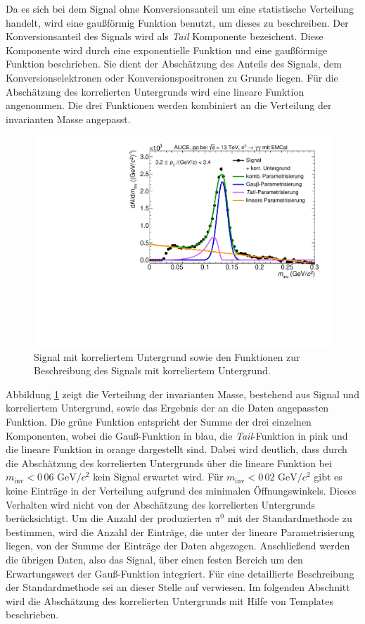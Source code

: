 Da es sich bei dem Signal ohne Konversionsanteil um eine statistische Verteilung handelt, wird eine gaußförmig Funktion benutzt, um dieses zu beschreiben.
\newline
Der Konversionsanteil des Signals wird als \textit{Tail} Komponente bezeichent.
Diese Komponente wird durch eine exponentielle Funktion und eine gaußförmige Funktion beschrieben.
Sie dient der Abschätzung des Anteils des Signals, dem Konversionselektronen oder Konversionspositronen zu Grunde liegen.
Für die Abschätzung des korrelierten Untergrunds wird eine lineare Funktion angenommen.
Die drei Funktionen werden kombiniert an die Verteilung der invarianten Masse angepasst.
\begin{figure}[tp]
\centering
\includegraphics[width=.75\linewidth]{StandardParam.pdf}
\caption{Signal mit korreliertem Untergrund sowie den Funktionen zur Beschreibung des Signals mit korreliertem Untergrund.}
\label{figStandardParam}
\end{figure}
\newline
Abbildung \ref{figStandardParam} zeigt die Verteilung der invarianten Masse, bestehend aus Signal und korreliertem Untergrund, sowie das Ergebnis der an die Daten angepassten Funktion.
Die grüne Funktion entspricht der Summe der drei einzelnen Komponenten, wobei die Gauß-Funktion in blau, die \textit{Tail}-Funktion in pink und die lineare Funktion in orange dargestellt sind.
Dabei wird deutlich, dass durch die Abschätzung des korrelierten Untergrunds über die lineare Funktion bei $m_\text{inv} < 0\,06\text{ GeV}/c^{2}$ kein Signal erwartet wird.
Für $m_\text{inv} < 0\,02\text{ GeV}/c^{2}$ gibt es keine Einträge in der Verteilung aufgrund des minimalen Öffnungswinkels.
Dieses Verhalten wird nicht von der Abschätzung des korrelierten Untergrunds berücksichtigt.
\newline
Um die Anzahl der produzierten $\pi^{0}$ mit der Standardmethode zu bestimmen, wird die Anzahl der Einträge, die unter der lineare Parametrisierung liegen, von der Summe der Einträge der Daten abgezogen.
Anschließend werden die übrigen Daten, also das Signal, über einen festen Bereich um den Erwartungswert der Gauß-Funktion integriert.
Für eine detaillierte Beschreibung der Standardmethode sei an dieser Stelle auf \cite{thesis:Adrian} verwiesen.
\newline
Im folgenden Abschnitt wird die Abschätzung des korrelierten Untergrunds mit Hilfe von Templates beschrieben.
